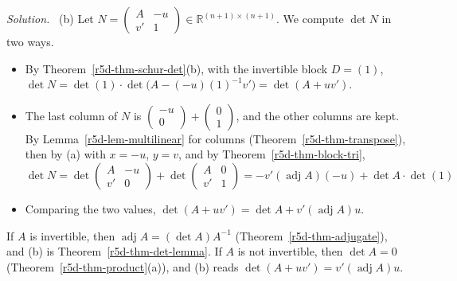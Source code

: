 \documentclass[12pt]{article}
\newcommand{\R}{\mathbb R}
\theoremstyle{definition}
\newenvironment{solution}{\par\noindent\textit{Solution.}\ }{\par\smallskip}
\begin{document}
\begin{solution}
(b) Let \(N=\left(\begin{smallmatrix}A&-u\\v'&1\end{smallmatrix}\right)\in\R^{(n+1)\times(n+1)}\). We compute \(\det N\) in
two ways.
\begin{itemize}
\item By Theorem~\ref{r5d-thm-schur-det}(b), with the invertible block \(D=(1)\),
\(\det N=\det(1)\cdot\det\bigl(A-(-u)(1)^{-1}v'\bigr)=\det(A+uv')\).
\item The last column of \(N\) is \(\left(\begin{smallmatrix}-u\\0\end{smallmatrix}\right)
+\left(\begin{smallmatrix}0\\1\end{smallmatrix}\right)\), and the other columns are kept. By
Lemma~\ref{r5d-lem-multilinear} for columns (Theorem~\ref{r5d-thm-transpose}), then by (a) with \(x=-u\), \(y=v\), and by
Theorem~\ref{r5d-thm-block-tri},
\[
\det N=\det\begin{pmatrix}A&-u\\v'&0\end{pmatrix}+\det\begin{pmatrix}A&0\\v'&1\end{pmatrix}
=-v'(\operatorname{adj}A)(-u)+\det A\cdot\det(1)
\]
\item Comparing the two values, \(\det(A+uv')=\det A+v'(\operatorname{adj}A)u\).
\end{itemize}
If \(A\) is invertible, then \(\operatorname{adj}A=(\det A)A^{-1}\) (Theorem~\ref{r5d-thm-adjugate}), and (b) is
Theorem~\ref{r5d-thm-det-lemma}. If \(A\) is not invertible, then \(\det A=0\) (Theorem~\ref{r5d-thm-product}(a)), and (b) reads
\(\det(A+uv')=v'(\operatorname{adj}A)u\).
\end{solution}
\end{document}
